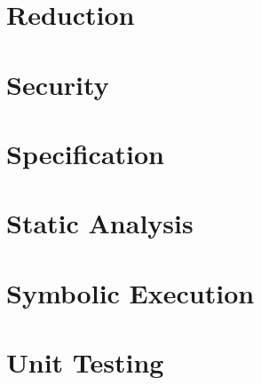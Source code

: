 \chapter{Reduction}

\chapter{Security}

\chapter{Specification}

\chapter{Static Analysis}

\chapter{Symbolic Execution}

\chapter{Unit Testing}
